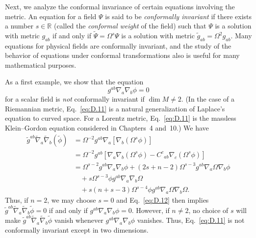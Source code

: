Next, we analyze the conformal invariance of certain equations involving the metric.
An equation for a field \(\Psi\) is said to be \emph{conformally invariant} if there
exists a number \(s\in\mathbb R\) (called the \emph{conformal weight} of the field)
such that \(\Psi\) is a solution with metric \(g_{ab}\) if and only if
\(\widetilde\Psi=\Omega^s\Psi\) is a solution with metric
\(\widetilde g_{ab}=\Omega^2g_{ab}\). Many equations for physical fields are
conformally invariant, and the study of the behavior of equations under conformal
transformations also is useful for many mathematical purposes.

As a first example, we show that the equation
\begin{equation}
  g^{ab}\nabla_a\nabla_b\phi=0
  \tag{D.11}\label{eq:D.11}
\end{equation}
for a scalar field is \emph{not} conformally invariant if \(\dim M\ne2\). (In the
case of a Riemannian metric, Eq.~\eqref{eq:D.11} is a natural generalization of
Laplace's equation to curved space. For a Lorentz metric, Eq.~\eqref{eq:D.11} is the
massless Klein--Gordon equation considered in Chapters~4 and~10.) We have
\begin{equation}
\begin{aligned}
  \widetilde g^{ab}\widetilde\nabla_a\widetilde\nabla_b(\widetilde\phi)
  &=\Omega^{-2}g^{ab}\nabla_a[\nabla_b(\Omega^s\phi)]\\
  &=\Omega^{-2}g^{ab}\left[
  \nabla_a\nabla_b(\Omega^s\phi)-C^c{}_{ab}\nabla_c(\Omega^s\phi)\right]\\
  &=\Omega^{s-2}g^{ab}\nabla_a\nabla_b\phi
  +(2s+n-2)\Omega^{s-3}g^{ab}\nabla_a\Omega\nabla_b\phi\\
  &\quad+s\Omega^{s-3}\phi g^{ab}\nabla_a\nabla_b\Omega\\
  &\quad+s(n+s-3)\Omega^{s-4}\phi g^{ab}\nabla_a\Omega\nabla_b\Omega.
\end{aligned}
  \tag{D.12}\label{eq:D.12}
\end{equation}
Thus, if \(n=2\), we may choose \(s=0\) and Eq.~\eqref{eq:D.12} then implies
\(\widetilde g^{ab}\widetilde\nabla_a\widetilde\nabla_b\widetilde\phi=0\) if and
only if \(g^{ab}\nabla_a\nabla_b\phi=0\). However, if \(n\ne2\), no choice of \(s\)
will make
\(\widetilde g^{ab}\widetilde\nabla_a\widetilde\nabla_b\widetilde\phi\) vanish
whenever \(g^{ab}\nabla_a\nabla_b\phi\) vanishes. Thus, Eq.~\eqref{eq:D.11} is not
conformally invariant except in two dimensions.

